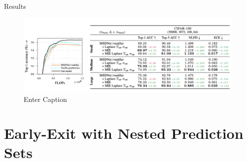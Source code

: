 \documentclass[aspectratio=169,xcolor=dvipsnames]{beamer}
\begin{document}
\begin{frame}{Results}

    \begin{figure}
        \centering
        \includegraphics[width=0.8\linewidth]{figs/Screenshot 2025-04-08 at 15.40.28.png}
        \caption{Enter Caption}
        \label{fig:enter-label}
    \end{figure}

\end{frame}




\section{Early-Exit with Nested Prediction Sets}
\end{document}
